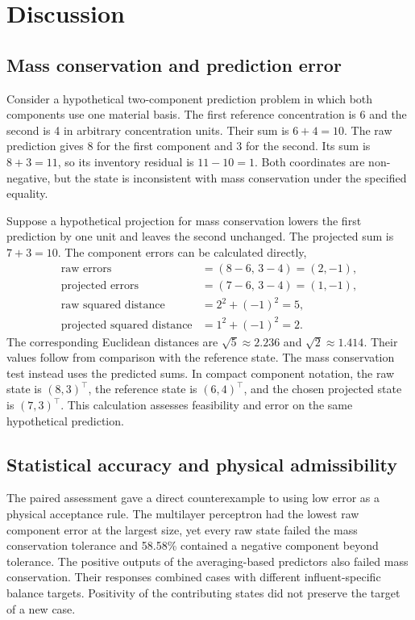 \section{Discussion}
\label{sec:projection_discussion}

\subsection{Mass conservation and prediction error}

Consider a hypothetical two-component prediction problem in which both components use one material basis. The first reference concentration is 6 and the second is 4 in arbitrary concentration units. Their sum is $6+4=10$. The raw prediction gives 8 for the first component and 3 for the second. Its sum is $8+3=11$, so its inventory residual is $11-10=1$. Both coordinates are non-negative, but the state is inconsistent with mass conservation under the specified equality.

Suppose a hypothetical projection for mass conservation lowers the first prediction by one unit and leaves the second unchanged. The projected sum is $7+3=10$. The component errors can be calculated directly,
\[
\begin{aligned}
\text{raw errors}&=(8-6,\,3-4)=(2,-1),\\
\text{projected errors}&=(7-6,\,3-4)=(1,-1),\\
\text{raw squared distance}&=2^2+(-1)^2=5,\\
\text{projected squared distance}&=1^2+(-1)^2=2.
\end{aligned}
\]
The corresponding Euclidean distances are $\sqrt5\approx2.236$ and $\sqrt2\approx1.414$. Their values follow from comparison with the reference state. The mass conservation test instead uses the predicted sums. In compact component notation, the raw state is $(8,3)^\top$, the reference state is $(6,4)^\top$, and the chosen projected state is $(7,3)^\top$. This calculation assesses feasibility and error on the same hypothetical prediction.

\subsection{Statistical accuracy and physical admissibility}

The paired assessment gave a direct counterexample to using low error as a physical acceptance rule. The multilayer perceptron had the lowest raw component error at the largest size, yet every raw state failed the mass conservation tolerance and 58.58\% contained a negative component beyond tolerance. The positive outputs of the averaging-based predictors also failed mass conservation. Their responses combined cases with different influent-specific balance targets. Positivity of the contributing states did not preserve the target of a new case.

